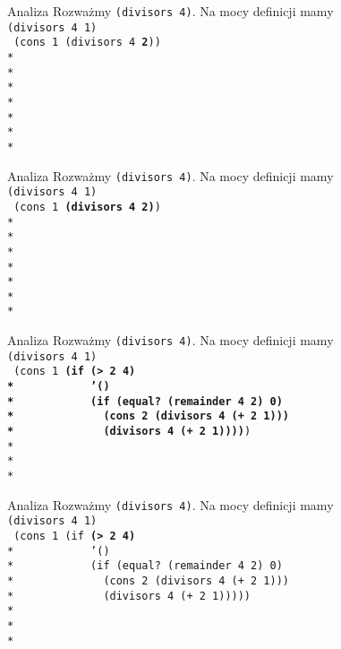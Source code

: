 \begin{frame}{Analiza}
  Rozważmy \texttt{(divisors 4)}. Na mocy definicji mamy\\
  \texttt{(divisors 4 1)}\\
  \texttt{
(cons 1 (divisors 4 \textbf{2}))\\*
\ \\*    
\ \\*
\ \\*
\ \\*
\ \\*
\ \\*
  }
\end{frame}

\begin{frame}{Analiza}
  Rozważmy \texttt{(divisors 4)}. Na mocy definicji mamy\\
  \texttt{(divisors 4 1)}\\
  \texttt{
(cons 1 \textbf{(divisors 4 2)})\\*
\ \\*
\ \\*
\ \\*
\ \\*
\ \\*
\ \\*
  }
\end{frame}

\begin{frame}{Analiza}
  Rozważmy \texttt{(divisors 4)}. Na mocy definicji mamy\\
  \texttt{(divisors 4 1)}\\
  \texttt{
(cons 1 \textbf{(if (> 2 4)\\*
\ \ \ \ \ \ \ \ \ \ \ '()\\*
\ \ \ \ \ \ \ \ \ \ \ (if (equal?\ (remainder 4 2) 0)\\*
\ \ \ \ \ \ \ \ \ \ \ \ \ (cons 2 (divisors 4 (+ 2 1)))\\*
\ \ \ \ \ \ \ \ \ \ \ \ \ (divisors 4 (+ 2 1))))})
\ \\*
\ \\*
\ \\*
  }
\end{frame}


\begin{frame}{Analiza}
  Rozważmy \texttt{(divisors 4)}. Na mocy definicji mamy\\
  \texttt{(divisors 4 1)}\\
  \texttt{
(cons 1 (if \textbf{(> 2 4)}\\*
\ \ \ \ \ \ \ \ \ \ \ '()\\*
\ \ \ \ \ \ \ \ \ \ \ (if (equal?\ (remainder 4 2) 0)\\*
\ \ \ \ \ \ \ \ \ \ \ \ \ (cons 2 (divisors 4 (+ 2 1)))\\*
\ \ \ \ \ \ \ \ \ \ \ \ \ (divisors 4 (+ 2 1)))))
\ \\*
\ \\*
\ \\*
  }
\end{frame}

